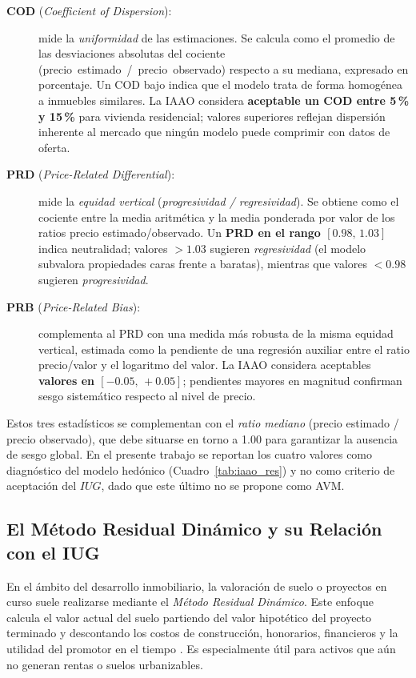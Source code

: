 \documentclass[12pt, a4paper, twoside, openright]{report}
\theoremstyle{plain}
\theoremstyle{definition}
\newcommand{\IUG}{IUG}             %
\begin{document}
\begin{description}
    \item[\textbf{COD} (\textit{Coefficient of Dispersion}):] mide la \emph{uniformidad} de las estimaciones. Se calcula como el promedio de las desviaciones absolutas del cociente \mbox{(precio estimado / precio observado)} respecto a su mediana, expresado en porcentaje. Un COD bajo indica que el modelo trata de forma homogénea a inmuebles similares. La IAAO considera \textbf{aceptable un COD entre 5\,\% y 15\,\%} para vivienda residencial; valores superiores reflejan dispersión inherente al mercado que ningún modelo puede comprimir con datos de oferta.

    \item[\textbf{PRD} (\textit{Price-Related Differential}):] mide la \emph{equidad vertical} (\textit{progresividad / regresividad}). Se obtiene como el cociente entre la media aritmética y la media ponderada por valor de los ratios precio estimado/observado. Un \textbf{PRD en el rango $[0.98,\,1.03]$} indica neutralidad; valores $>1.03$ sugieren \emph{regresividad} (el modelo subvalora propiedades caras frente a baratas), mientras que valores $<0.98$ sugieren \emph{progresividad}.

    \item[\textbf{PRB} (\textit{Price-Related Bias}):] complementa al PRD con una medida más robusta de la misma equidad vertical, estimada como la pendiente de una regresión auxiliar entre el ratio precio/valor y el logaritmo del valor. La IAAO considera aceptables \textbf{valores en $[-0.05,\,+0.05]$}; pendientes mayores en magnitud confirman sesgo sistemático respecto al nivel de precio.
\end{description}

Estos tres estadísticos se complementan con el \emph{ratio mediano} (precio estimado / precio observado), que debe situarse en torno a 1.00 para garantizar la ausencia de sesgo global. En el presente trabajo se reportan los cuatro valores como diagnóstico del modelo hedónico (Cuadro~\ref{tab:iaao_res}) y no como criterio de aceptación del $\IUG{}$, dado que este último no se propone como AVM.

\subsection{El Método Residual Dinámico y su Relación con el IUG}
En el ámbito del desarrollo inmobiliario, la valoración de suelo o proyectos en curso suele realizarse mediante el \emph{Método Residual Dinámico}. Este enfoque calcula el valor actual del suelo partiendo del valor hipotético del proyecto terminado y descontando los costos de construcción, honorarios, financieros y la utilidad del promotor en el tiempo \citep{TasadorResidual}. Es especialmente útil para activos que aún no generan rentas o suelos urbanizables.
\end{document}
